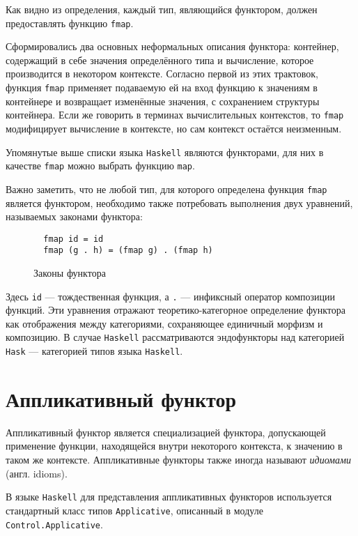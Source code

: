   Как видно из определения, каждый тип, являющийся функтором, должен предоставлять
  функцию \lstinline{fmap}.

  Сформировались два основных неформальных описания функтора: контейнер,
  содержащий в себе значения определённого типа и вычисление, которое производится
  в некотором контексте. Согласно первой из этих трактовок, функция
  \lstinline{fmap} применяет подаваемую ей на вход функцию к значениям в
  контейнере и возвращает изменённые значения, с сохранением структуры контейнера.
  Если же говорить в терминах вычислительных контекстов, то \lstinline{fmap}
  модифицирует вычисление в контексте, но сам контекст остаётся неизменным.

  Упомянутые выше списки языка \lstinline{Haskell} являются функторами, для них в
  качестве \lstinline{fmap} можно выбрать функцию \lstinline{map}.

  Важно заметить, что не любой тип, для которого определена функция
  \lstinline{fmap} является функтором, необходимо также потребовать выполнения
  двух уравнений, называемых законами функтора:

  \begin{figure}[h]
  \begin{lstlisting}
  fmap id = id
  fmap (g . h) = (fmap g) . (fmap h)
  \end{lstlisting}
  \caption{Законы функтора}
  \label{listing:FunctorLaws}
  \end{figure}

  Здесь \lstinline{id} --- тождественная функция, а \lstinline{.} --- инфиксный
  оператор композиции функций. Эти уравнения отражают теоретико-категорное
  определение функтора как отображения между категориями, сохраняющее единичный
  морфизм и композицию. В случае \lstinline{Haskell} рассматриваются эндофункторы
  над категорией \lstinline{Hask} --- категорией типов языка \lstinline{Haskell}.

\section{Аппликативный функтор}

  Аппликативный функтор является специализацией функтора, допускающей применение
  функции, находящейся внутри некоторого контекста, к значению в таком же
  контексте. Аппликативные функторы также иногда называют \emph{идиомами}
  (англ. idioms).

  В языке \lstinline{Haskell} для представления аппликативных функторов
  используется стандартный класс типов \lstinline{Applicative},
  описанный в модуле \lstinline{Control.Applicative}.


